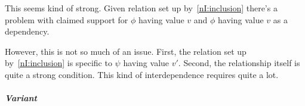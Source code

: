 \begin{note}
  This seems kind of strong.
  Given relation set up by~\ref{nI:inclusion} there's a problem with claimed support for \(\phi\) having value \(v\) and \(\phi\) having value \(v\) as a dependency.

  However, this is not so much of an issue.
  First, the relation set up by~\ref{nI:inclusion} is specific to \(\psi\) having value \(v'\).
  Second, the relationship itself is quite a strong condition.
  This kind of interdependence requires quite a lot.
\end{note}




\subparagraph*{Variant}


